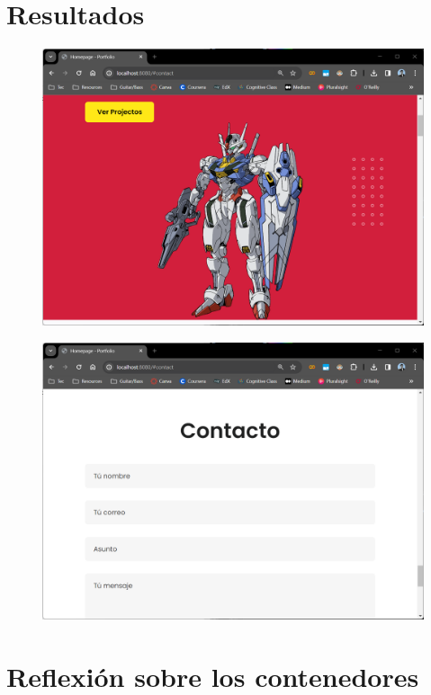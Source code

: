\documentclass[12pt,a4paper]{article}
\begin{document}
\section{Resultados}

\begin{figure}[H]
    \centering
    \includegraphics[width=1\linewidth]{M3_Virtualización_y_Contenedores/Tarea_3_Creación_Contenedor_Docker/reporte/figuras/7-1_Resultados.png}
    \label{fig:Resultados_1}
\end{figure}

\begin{figure}[H]
    \centering
    \includegraphics[width=1\linewidth]{M3_Virtualización_y_Contenedores/Tarea_3_Creación_Contenedor_Docker/reporte/figuras/7-2_Resultados.png}
    \label{fig:Resultados_2}
\end{figure}


\section{Reflexión sobre los contenedores}


\vspace{1em}
\end{document}
